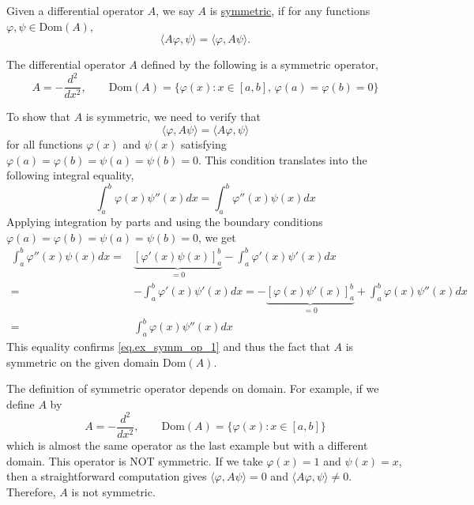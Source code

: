 \begin{definition} Given a differential operator $A$, we say $A$ is \underline{symmetric}, if for any functions $\varphi, \psi\in \mathrm{Dom}(A)$,
\begin{equation}\label{eq.symm_operator}
    \langle A\varphi, \psi\rangle = \langle \varphi, A\psi\rangle.
\end{equation}
    
\end{definition}

\begin{example}[]\label{ex.symm_op}
The differential operator $A$ defined by the following is a symmetric operator,
\begin{equation}
A = -\frac{d^2}{dx^2},\qquad \mathrm{Dom}(A) = \{\varphi(x): x\in [a, b],\,\varphi(a) = \varphi(b) = 0\}
\end{equation}

To show that $A$ is symmetric, we need to verify that
\begin{equation}\label{eq.ex_symm_op_1}
\langle \varphi, A\psi \rangle = \langle A\varphi, \psi \rangle
\end{equation}
for all functions $\varphi(x)$ and $\psi(x)$ satisfying $\varphi(a) = \varphi(b) = \psi(a) = \psi(b) = 0$. This condition translates into the following integral equality,
\begin{equation}
\int_a^b \varphi(x) \psi''(x) dx = \int_a^b \varphi''(x) \psi(x) dx
\end{equation}
Applying integration by parts and using the boundary conditions $\varphi(a) = \varphi(b) = \psi(a) = \psi(b) = 0$, we get
\begin{equation}
\begin{split}
    \int_a^b \varphi''(x) \psi(x) dx =& \underbrace{\left[\varphi'(x) \psi(x)\right]_a^b}_{ = 0} - \int_a^b \varphi'(x) \psi'(x) dx 
    \\
    =& - \int_a^b \varphi'(x) \psi'(x) dx = -\underbrace{\left[\varphi(x) \psi'(x)\right]_a^b}_{ = 0} + \int_a^b \varphi(x) \psi''(x) dx
    \\
    =& \int_a^b \varphi(x) \psi''(x) dx
\end{split}
\end{equation}
This equality confirms \eqref{eq.ex_symm_op_1} and thus the fact that $A$ is symmetric on the given domain $\mathrm{Dom}(A)$.
\end{example}

\begin{example}
    The definition of symmetric operator depends on domain. For example, if we define $A$ by 
    \begin{equation}
        A = -\frac{d^2}{dx^2},\qquad \mathrm{Dom}(A) = \{\varphi(x): x\in [a, b]\}
    \end{equation}
    which is almost the same operator as the last example but with a different domain. This operator is NOT symmetric. If we take $\varphi(x) = 1$ and $\psi(x) = x$, then a straightforward computation gives $\langle \varphi, A\psi \rangle = 0$ and  $\langle A\varphi, \psi \rangle \neq 0$. Therefore, $A$ is not symmetric.
\end{example}

